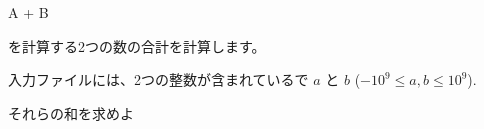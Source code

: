 \begin{problem}{A + B}

を計算する2つの数の合計を計算します。

\InputFile

入力ファイルには、2つの整数が含まれているで $a$ と $b$ ($-10^9 \le a, b \le 10^9$).

\OutputFile

それらの和を求めよ

\end{problem}
